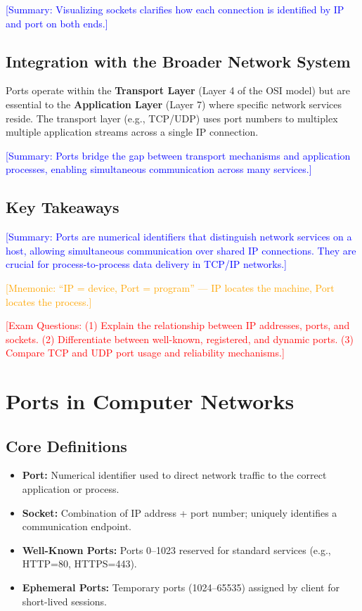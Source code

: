 \documentclass[12pt]{article}
\begin{document}
\textcolor{blue}{[Summary: Visualizing sockets clarifies how each connection is identified by IP and port on both ends.]}

\subsection{Integration with the Broader Network System}
Ports operate within the \textbf{Transport Layer} (Layer 4 of the OSI model) but are essential to the \textbf{Application Layer} (Layer 7) where specific network services reside. The transport layer (e.g., TCP/UDP) uses port numbers to multiplex multiple application streams across a single IP connection.

\textcolor{blue}{[Summary: Ports bridge the gap between transport mechanisms and application processes, enabling simultaneous communication across many services.]}

\subsection{Key Takeaways}

\textcolor{blue}{[Summary: Ports are numerical identifiers that distinguish network services on a host, allowing simultaneous communication over shared IP connections. They are crucial for process-to-process data delivery in TCP/IP networks.]}

\textcolor{orange}{[Mnemonic: ``IP = device, Port = program'' — IP locates the machine, Port locates the process.]}

\textcolor{red}{[Exam Questions:
            (1) Explain the relationship between IP addresses, ports, and sockets.
            (2) Differentiate between well-known, registered, and dynamic ports.
            (3) Compare TCP and UDP port usage and reliability mechanisms.]}




\section{Ports in Computer Networks}

\subsection{Core Definitions}
\begin{itemize}
    \item \textbf{Port:} Numerical identifier used to direct network traffic to the correct application or process.
    \item \textbf{Socket:} Combination of IP address + port number; uniquely identifies a communication endpoint.
    \item \textbf{Well-Known Ports:} Ports 0--1023 reserved for standard services (e.g., HTTP=80, HTTPS=443).
    \item \textbf{Ephemeral Ports:} Temporary ports (1024--65535) assigned by client for short-lived sessions.
\end{itemize}
\end{document}
